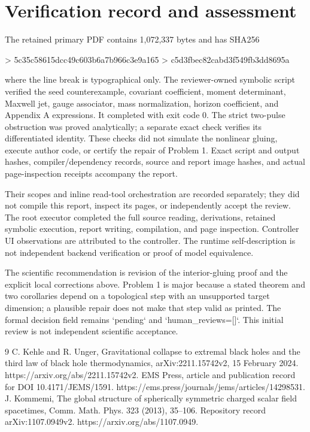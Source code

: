 \documentclass[10pt]{article}
\begin{document}
\section*{Verification record and assessment}
The retained primary PDF contains 1,072,337 bytes and has SHA256\par
> 5c35c58615dcc49c603b6a7b966c3e9a165
> c5d3fbec82cabd3f549fb3dd8695a\par
where the line break is typographical only. The reviewer-owned symbolic script verified the seed counterexample, covariant coefficient, moment determinant, Maxwell jet, gauge associator, mass normalization, horizon coefficient, and Appendix A expressions. It completed with exit code 0. The strict two-pulse obstruction was proved analytically; a separate exact check verifies its differentiated identity. These checks did not simulate the nonlinear gluing, execute author code, or certify the repair of Problem 1. Exact script and output hashes, compiler/dependency records, source and report image hashes, and actual page-inspection receipts accompany the report.\par
Their scopes and inline read-tool orchestration are recorded separately; they did not compile this report, inspect its pages, or independently accept the review. The root executor completed the full source reading, derivations, retained symbolic execution, report writing, compilation, and page inspection. Controller UI observations are attributed to the controller. The runtime self-description is not independent backend verification or proof of model equivalence.\par
The scientific recommendation is revision of the interior-gluing proof and the explicit local corrections above. Problem 1 is major because a stated theorem and two corollaries depend on a topological step with an unsupported target dimension; a plausible repair does not make that step valid as printed. The formal decision field remains `pending` and `human\_reviews=[]`. This initial review is not independent scientific acceptance.\par
9 C. Kehle and R. Unger, Gravitational collapse to extremal black holes and the third law of black hole thermodynamics, arXiv:2211.15742v2, 15 February 2024. https://arxiv.org/abs/2211.15742v2. EMS Press, article and publication record for DOI 10.4171/JEMS/1591. https://ems.press/journals/jems/articles/14298531. J. Kommemi, The global structure of spherically symmetric charged scalar field spacetimes, Comm. Math. Phys. 323 (2013), 35–106. Repository record arXiv:1107.0949v2. https://arxiv.org/abs/1107.0949.\par
\end{document}
